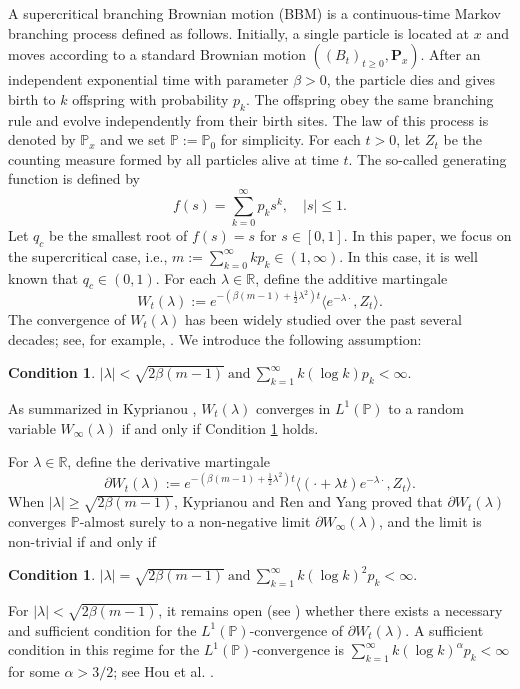 \documentclass[10pt,a4paper]{amsart}
\newtheorem{con1}[con0]{Condition}
\numberwithin{equation}{section}
\def\bgcondition{\begin{con1}}\def\edcondition{\end{con1}}
\begin{document}
A supercritical branching Brownian motion (BBM) is a continuous-time Markov branching process defined as follows. Initially, a single particle is located at $x$ and moves according to a standard Brownian motion $((B_t)_{t \geq 0}, \mathbf{P}_x)$. After an independent exponential time with parameter $\beta > 0$, the particle dies and gives birth to $k$ offspring with probability $p_k$. The offspring obey the same branching rule and evolve independently from their birth sites. The law of this process is denoted by $\mathbb{P}_x$ and we set $\mathbb{P}:= \mathbb{P}_0$ for simplicity. For each $t > 0$, let $Z_t$ be the counting measure formed by all particles alive at time 
$t$.
The so-called generating function is defined by
$$
f(s)=\sum_{k=0}^\infty p_k s^k,\quad |s|\le1.
$$
Let $q_c$ be the smallest root of $f(s)=s$ for $s\in[0,1]$. In this paper, we focus on the supercritical case, i.e., $m := \sum_{k=0}^\infty k p_k \in (1, \infty)$. In this case, it is well known that $q_c\in(0,1)$.
For each $\lambda \in \mathbb{R}$, define the additive martingale
\[
W_t(\lambda) := e^{-(\beta(m-1) + \frac{1}{2}\lambda^2)t} \langle e^{-\lambda \cdot}, Z_t \rangle.
\]
The convergence of $W_t(\lambda)$ has been widely studied over the past several decades; see, for example, \cite{Biggins, Chauvin,  Kingman, K04, Neveu}. 
We introduce the following assumption:
\bgcondition\label{cond1}
$|\lambda|< \sqrt{2\beta (m-1)} \ \mbox{and}\  \sum_{k=1}^\infty k(\log k) p_k<\infty. $
\edcondition

\noindent
As summarized in Kyprianou \cite[Theorem 1]{K04}, $W_t(\lambda)$ converges in $L^1(\mathbb{P})$ to a random variable $W_\infty(\lambda)$ if and only if Condition \ref{cond1} holds.

For $\lambda\in \mathbb{R}$, define
the derivative martingale
\[
\partial W_t(\lambda) := e^{-(\beta(m-1) + \frac{1}{2}\lambda^2)t} \langle (\cdot + \lambda t) e^{-\lambda \cdot}, Z_t \rangle.
\]
When $|\lambda| \geq \sqrt{2\beta(m-1)}$, Kyprianou \cite{K04} and Ren and Yang \cite{YR11} proved that $\partial W_t(\lambda)$ converges $\mathbb{P}$-almost surely to a non-negative limit $\partial W_\infty(\lambda)$, and the limit is non-trivial if and only if 
\bgcondition\label{cond2}
$|\lambda|= \sqrt{2\beta (m-1)} \  \mbox{and}\ \sum_{k=1}^\infty k(\log k)^2 p_k<\infty. $
\edcondition

\noindent
For $|\lambda| < \sqrt{2\beta(m-1)}$, it remains open (see \cite[Remark 4]{K04}) whether there exists a necessary and sufficient condition for the $L^1(\mathbb{P})$-convergence of $\partial W_t(\lambda)$. A sufficient condition 
in this regime
for the $L^1(\mathbb{P})$-convergence is $\sum_{k=1}^\infty k (\log k)^{\alpha} p_k < \infty$ for some $\alpha > 3/2$; see Hou et al. \cite[Proposition 2.6]{HRS2024}.
\end{document}
